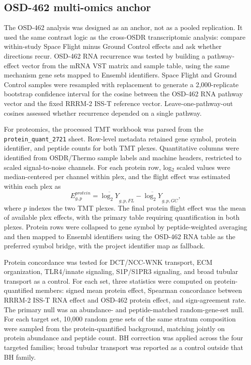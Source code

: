 \documentclass[11pt]{article}
\newcommand{\code}[1]{\texttt{#1}}
\begin{document}
\subsection{OSD-462 multi-omics anchor}

The OSD-462 analysis was designed as an anchor, not as a pooled replication. It used the same contrast logic as the cross-OSDR transcriptomic analysis: compare within-study Space Flight minus Ground Control effects and ask whether directions recur. OSD-462 RNA recurrence was tested by building a pathway-effect vector from the mRNA VST matrix and sample table, using the same mechanism gene sets mapped to Ensembl identifiers. Space Flight and Ground Control samples were resampled with replacement to generate a 2,000-replicate bootstrap confidence interval for the cosine between the OSD-462 RNA pathway vector and the fixed RRRM-2 ISS-T reference vector. Leave-one-pathway-out cosines assessed whether recurrence depended on a single pathway.

For proteomics, the processed TMT workbook was parsed from the \code{protein\_quant\_2721} sheet. Row-level metadata retained gene symbol, protein identifier, and peptide counts for both TMT plexes. Quantitative columns were identified from OSDR/Thermo sample labels and machine headers, restricted to scaled signal-to-noise channels. For each protein row, log$_2$ scaled values were median-centered per channel within plex, and the flight effect was estimated within each plex as
\begin{equation}
E_{g,p}^{protein}=\overline{\log_2 Y}_{g,p,FL}-\overline{\log_2 Y}_{g,p,GC},
\end{equation}
where $p$ indexes the two TMT plexes. The final protein flight effect was the mean of available plex effects, with the primary table requiring quantification in both plexes. Protein rows were collapsed to gene symbol by peptide-weighted averaging and then mapped to Ensembl identifiers using the OSD-462 RNA table as the preferred symbol bridge, with the project identifier map as fallback.

Protein concordance was tested for DCT/NCC-WNK transport, ECM organization, TLR4/innate signaling, S1P/S1PR3 signaling, and broad tubular transport as a control. For each set, three statistics were computed on protein-quantified members: signed mean protein effect, Spearman concordance between RRRM-2 ISS-T RNA effect and OSD-462 protein effect, and sign-agreement rate. The primary null was an abundance- and peptide-matched random-gene-set null. For each target set, 10,000 random gene sets of the same stratum composition were sampled from the protein-quantified background, matching jointly on protein abundance and peptide count. BH correction was applied across the four targeted families; broad tubular transport was reported as a control outside that BH family.
\end{document}
